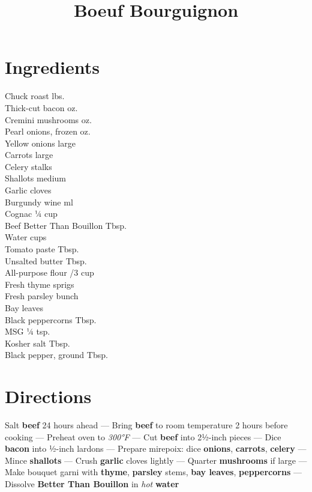 \documentclass[11pt,letterpaper]{article}
\title{Boeuf Bourguignon}
\author{}
\date{}
\begin{document}
\maketitle
\thispagestyle{empty}

\section*{Ingredients}
\setlength{\columnsep}{20pt}
\begin{multicols}{2}
\noindent
    Chuck roast  lbs. \\
    Thick-cut bacon  oz. \\
    Cremini mushrooms  oz. \\
    Pearl onions, frozen  oz. \\
    Yellow onions  large \\
    Carrots  large \\
    Celery stalks  \\
    Shallots  medium \\
    Garlic cloves  \\
    Burgundy wine  ml \\
    Cognac \dotfill ¼ cup \\
    Beef Better Than Bouillon  Tbsp. \\
    \columnbreak
    Water  cups \\
    Tomato paste  Tbsp. \\
    Unsalted butter  Tbsp. \\
    All-purpose flour /3 cup \\
    Fresh thyme  sprigs \\
    Fresh parsley  bunch \\
    Bay leaves  \\
    Black peppercorns  Tbsp. \\
    MSG \dotfill ¼ tsp. \\
    Kosher salt  Tbsp. \\
    Black pepper, ground  Tbsp.
\end{multicols}

\section*{Directions}

\noindent
Salt \textbf{beef} 24 hours ahead ---
Bring \textbf{beef} to room temperature 2 hours before cooking ---
Preheat oven to \textit{300°F} ---
Cut \textbf{beef} into 2½-inch pieces ---
Dice \textbf{bacon} into ½-inch lardons ---
Prepare mirepoix: dice \textbf{onions}, \textbf{carrots}, \textbf{celery} ---
Mince \textbf{shallots} ---
Crush \textbf{garlic} cloves lightly ---
Quarter \textbf{mushrooms} if large ---
Make bouquet garni with \textbf{thyme}, \textbf{parsley} stems, \textbf{bay leaves}, \textbf{peppercorns} ---
Dissolve \textbf{Better Than Bouillon} in \textit{hot} \textbf{water}
\end{document}
